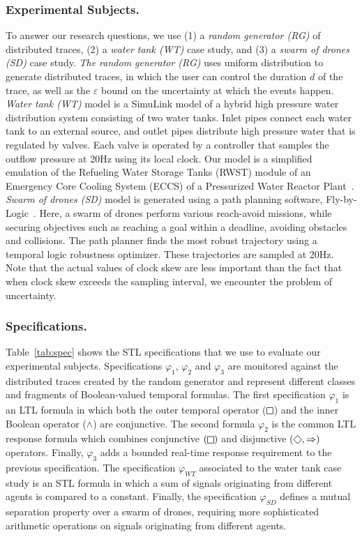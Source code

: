 \subsubsection{Experimental Subjects.}
To answer our research questions, we use (1) a \emph{random generator (RG)} of distributed traces, (2) a \emph{water tank (WT)} case study, and (3) a \emph{swarm of drones (SD)} case study.  
%
\emph{The random generator (RG)} uses uniform distribution to generate distributed traces, in which the user can control the duration $d$ of the trace, as well as the $\varepsilon$ bound on the uncertainty at which the events happen.
\emph{Water tank (WT)} model is a SimuLink model of a hybrid high pressure water distribution system consisting of two water tanks. Inlet pipes connect each water tank to an external source, and outlet pipes distribute high pressure water that is regulated by valves.
Each valve is operated by a controller that samples the outflow pressure at 20Hz using its local clock. Our model is a simplified emulation of the Refueling Water Storage Tanks (RWST) module of an Emergency Core Cooling System (ECCS) of a Pressurized Water Reactor Plant~\cite{USNRCPWR}.
\emph{Swarm of drones (SD)} model is generated using a path planning software, Fly-by-Logic~\cite{PantAM17CCTA}. Here, a swarm of drones perform various reach-avoid missions, while securing objectives such as reaching a goal within a deadline, avoiding obstacles and collisions. The path planner finds the most robust trajectory using a temporal logic robustness optimizer. These trajectories are sampled at 20Hz.
\alert{Note that the actual values of clock skew are less important than the fact that when clock skew exceeds the sampling interval, we encounter the problem of uncertainty.}

\subsubsection{Specifications.}
Table~\ref{tab:spec} shows the STL specifications that we use to evaluate our experimental subjects. Specifications $\varphi_{1}$, $\varphi_{2}$ and $\varphi_{3}$ are monitored against the distributed traces created by the random generator and represent different classes and fragments of Boolean-valued temporal formulas. The first specification $\varphi_1$ is an LTL formula in which both the outer temporal operator ($\LTLg$) and the inner Boolean operator ($\wedge$) are conjunctive. The second formula $\varphi_2$ is the common LTL response formula which combines conjunctive $(\LTLg)$ and disjunctive $(\LTLf, \Rightarrow)$ operators. Finally, $\varphi_3$ adds a bounded real-time response requirement to the previous specification. The specification $\varphi_{WT}$ associated to the water tank case study is an STL formula in which a sum of signals originating from different agents is compared to a constant. Finally, the specification $\varphi_{SD}$ defines a mutual separation property over a swarm of drones, requiring more sophisticated arithmetic operations on signals originating from different agents.

